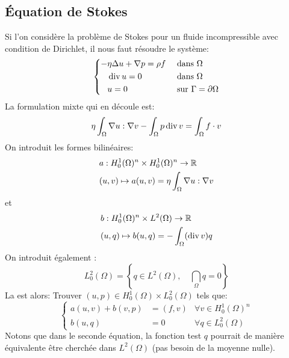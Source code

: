 \subsection{Équation de Stokes}
Si l'on considère la problème de Stokes pour un fluide incompressible avec condition de Dirichlet, il
nous faut résoudre le système:
\begin{equation}\left\{
\begin{aligned}
-&\eta \Delta u + \nabla p  = \rho f && \text{ dans } \Omega\\
&\operatorname{div} u = 0&& \text{ dans } \Omega\\
&u =0&& \text{ sur } \Gamma=\partial\Omega
\end{aligned}\right.
\end{equation}
La formulation mixte qui en découle est:
\begin{equation}
\eta\dint_\Omega \nabla u : \nabla v %
- \dint_\Omega p \dive v %
= \dint_\Omega f\cdot v %
\end{equation}
On introduit les formes bilinéaires:
\begin{equation}
\begin{aligned}
&a : H^1_0(\Omega)^n\times H^1_0(\Omega)^n \rightarrow \mathbb R \\
&(u,v) \mapsto a(u,v)=\eta\displaystyle\int_\Omega \nabla u : \nabla v
\end{aligned}
\end{equation}
et
\begin{equation}
\begin{aligned}
&b : H^1_0(\Omega)^n\times L^2(\Omega) \rightarrow \mathbb R\\
&(u,q) \mapsto b(u,q)=-\displaystyle\int_\Omega (\operatorname{div} v) q
\end{aligned}
\end{equation}
\medskip
On introduit également :
\begin{equation}L^2_0(\Omega)=\left\{ q\in L^2(\Omega),\quad \dint_\Omega q %
= 0\right\}\end{equation}
\medskip
La  est alors:
Trouver $(u,p)\in H^1_0(\Omega)\times L^2_0(\Omega)$ tels que:
\begin{equation}\left\{
\begin{array}{rll}
a(u,v)+b(v,p) &= (f,v) & \forall v\in H^1_0(\Omega)^n \\
b(u,q) &=0 &\forall q \in L^2_0(\Omega)
\end{array}\right.
\end{equation}
Notons que dans le seconde équation, la fonction test $q$ pourrait de manière équivalente
être cherchée dans $L^2(\Omega)$ (pas besoin de la moyenne nulle).

